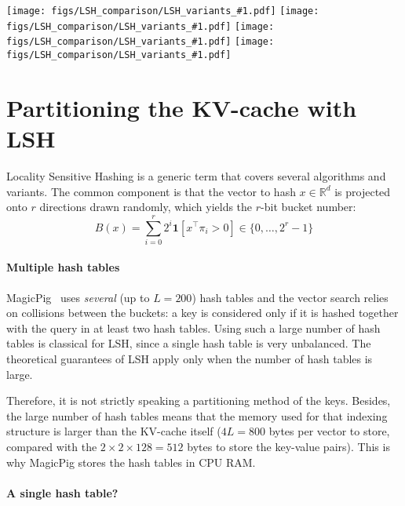 
%
\newcommand{\igN}[1]{\texttt{[image: figs/LSH\_comparison/LSH\_variants\_\#1.pdf]}}
\begin{figure*}
    \centering
    \igN{layer11_head0}%
    \igN{layer13_head2}%
    \igN{layer14_head6}%
    \igN{layer15_head5}   
    \caption{
MSE vs. selectivity for three LSH variants, compared to a random selection and a partition based on k-means (the baseline for \OURS{}), on 4 representative heads. 
    }
    \label{fig:LSHvariants}
\end{figure*}



\section{Partitioning the KV-cache with LSH}
\label{app:lshvariants}

Locality Sensitive Hashing is a generic term that covers several algorithms and variants.
The common component is that the vector to hash $x\in\mathbb{R}^d$ is projected onto $r$ directions drawn randomly, which yields the $r$-bit bucket number:
\begin{equation}
    B(x) = \sum_{i=0}^{r}
    2^i \mathbf{1}[x^\top\pi_i > 0] \in \{0,\dots,2^r - 1\}
    \label{eq:lshone}
\end{equation}

\paragraph{Multiple hash tables}

MagicPig~\cite{zhuoming2024magicpig} uses \emph{several} (up to $L=200$) hash tables and the vector search relies on collisions between the buckets: a key is considered only if it is hashed together with the query in at least two hash tables. 
Using such a large number of hash tables is classical for LSH, since a single hash table is very unbalanced. 
The theoretical guarantees of LSH apply only when the number of hash tables is large. 

Therefore, it is not strictly speaking a partitioning method of the keys. 
Besides, the large number of hash tables means that the memory used for that indexing structure is larger than the KV-cache itself ($4L = 800$ bytes per vector to store, compared with the $2\times2\times 128=512$ bytes to store the key-value pairs). 
This is why MagicPig stores the hash tables in CPU RAM. 

\paragraph{A single hash table?}

